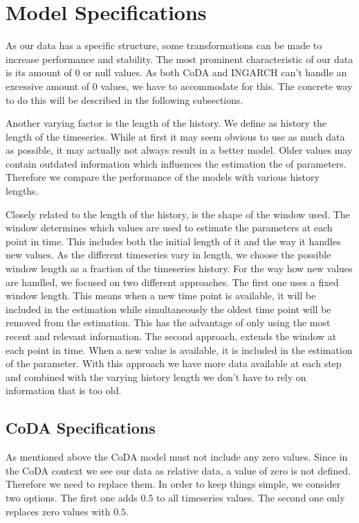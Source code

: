 \section{Model Specifications}
\label{sec: Model Specification}

As our data has a specific structure, some transformations can be made to increase performance and stability. The most prominent characteristic of our data is its amount of 0 or null values. As both CoDA and INGARCH can't handle an excessive amount of 0 values, we have to accommodate for this. The concrete way to do this will be described in the following subsections. 

Another varying factor is the length of the history. We define as history the length of the timeseries. While at first it may seem obvious to use as much data as possible, it may actually not always result in a better model. Older values may contain outdated information which influences the estimation the of parameters. Therefore we compare the performance of the models with various history lengths. 

Closely related to the length of the history, is the shape of the window used. The window determines which values are used to estimate the parameters at each point in time. This includes both the initial length of it and the way it handles new values. As the different timeseries vary in length, we choose the possible window length as a fraction of the timeseries history. For the way how new values are handled, we focused on two different approaches. The first one uses a fixed window length. This means when a new time point is available, it will be included in the estimation while simultaneously the oldest time point will be removed from the estimation. This has the advantage of only using the most recent and relevant information. The second approach, extends the window at each point in time. When a new value is available, it is included in the estimation of the parameter. With this approach we have more data available at each step and combined with the varying history length we don't have to rely on information that is too old.

\subsection{CoDA Specifications}
\label{sec: Coda Specifications}

As mentioned above the CoDA model must not include any zero values. Since in the CoDA context we see our data as relative data, a value of zero is not defined. Therefore we need to replace them. In order to keep things simple, we consider two options. The first one adds $0.5$ to all timeseries values. The second one only replaces zero values with $0.5$.

